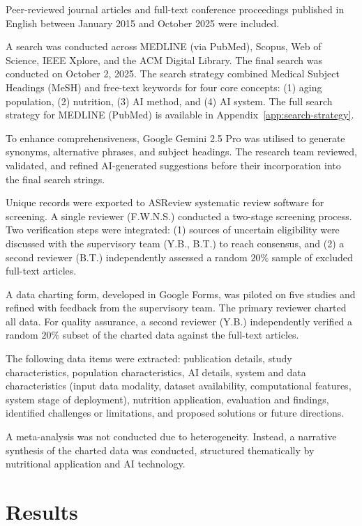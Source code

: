 Peer-reviewed journal articles and full-text conference proceedings published in English between January 2015 and October 2025 were included.

A search was conducted across MEDLINE (via PubMed), Scopus, Web of Science, IEEE Xplore, and the ACM Digital Library. The final search was conducted on October 2, 2025. The search strategy combined Medical Subject Headings (MeSH) and free-text keywords for four core concepts: (1) aging population, (2) nutrition, (3) AI method, and (4) AI system. The full search strategy for MEDLINE (PubMed) is available in Appendix~\ref{app:search-strategy}.

To enhance comprehensiveness, Google Gemini 2.5 Pro was utilised to generate synonyms, alternative phrases, and subject headings. The research team reviewed, validated, and refined AI-generated suggestions before their incorporation into the final search strings.

Unique records were exported to ASReview systematic review software \citep{vandeschootOpenSourceMachine2021} for screening. A single reviewer (F.W.N.S.) conducted a two-stage screening process. Two verification steps were integrated: (1) sources of uncertain eligibility were discussed with the supervisory team (Y.B., B.T.) to reach consensus, and (2) a second reviewer (B.T.) independently assessed a random $20\%$ sample of excluded full-text articles.

A data charting form, developed in Google Forms, was piloted on five studies and refined with feedback from the supervisory team. The primary reviewer charted all data. For quality assurance, a second reviewer (Y.B.) independently verified a random $20\%$ subset of the charted data against the full-text articles.

The following data items were extracted: publication details, study characteristics, population characteristics, AI details, system and data characteristics (input data modality, dataset availability, computational features, system stage of deployment), nutrition application, evaluation and findings, identified challenges or limitations, and proposed solutions or future directions.

A meta-analysis was not conducted due to heterogeneity. Instead, a narrative synthesis of the charted data was conducted, structured thematically by nutritional application and AI technology.

\section{Results}
\label{sec:results}

